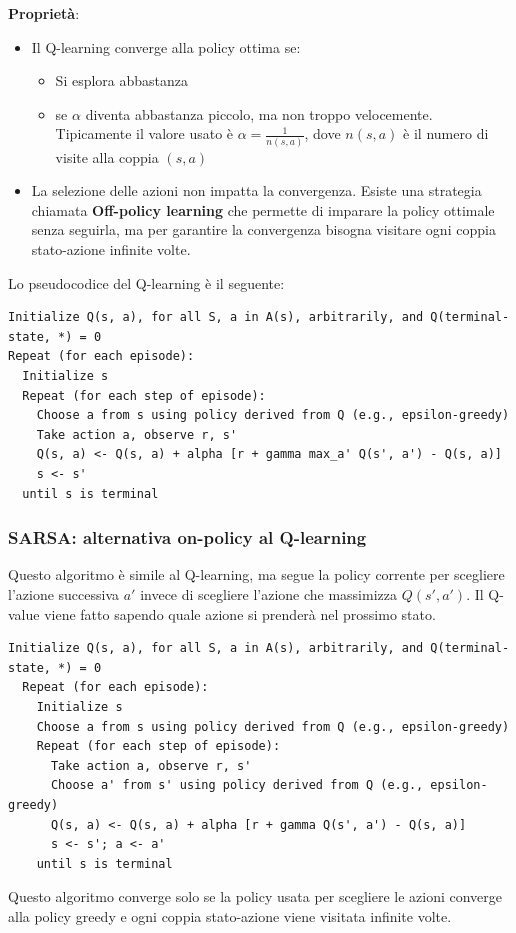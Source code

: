 \documentclass[a4paper]{article}
\begin{document}
\vspace{1em}
\noindent
\textbf{Proprietà}:
\begin{itemize}
  \item Il Q-learning converge alla policy ottima se:
    \begin{itemize}
      \item Si esplora abbastanza
      \item se \( \alpha \) diventa abbastanza piccolo, ma non troppo velocemente.
        Tipicamente il valore usato è \( \alpha = \frac{1}{n(s, a)} \), dove \( n(s,a) \) 
        è il numero di visite alla coppia \( (s,a) \)
    \end{itemize}

  \item La selezione delle azioni non impatta la convergenza. Esiste una strategia chiamata
    \textbf{Off-policy learning} che permette di imparare la policy ottimale senza seguirla,
    ma per garantire la convergenza bisogna visitare ogni coppia stato-azione infinite volte.
\end{itemize}

\vspace{1em}
\noindent
Lo pseudocodice del Q-learning è il seguente:
\begin{lstlisting}
Initialize Q(s, a), for all S, a in A(s), arbitrarily, and Q(terminal-state, *) = 0
Repeat (for each episode):
  Initialize s
  Repeat (for each step of episode):
    Choose a from s using policy derived from Q (e.g., epsilon-greedy)
    Take action a, observe r, s'
    Q(s, a) <- Q(s, a) + alpha [r + gamma max_a' Q(s', a') - Q(s, a)]
    s <- s'
  until s is terminal
\end{lstlisting}

\subsubsection{SARSA: alternativa on-policy al Q-learning}
Questo algoritmo è simile al Q-learning, ma segue la policy corrente per scegliere
l'azione successiva \( a' \) invece di scegliere l'azione che massimizza \( Q(s', a') \).
Il Q-value viene fatto sapendo quale azione si prenderà nel prossimo stato.
\begin{lstlisting}
Initialize Q(s, a), for all S, a in A(s), arbitrarily, and Q(terminal-state, *) = 0
  Repeat (for each episode):
    Initialize s
    Choose a from s using policy derived from Q (e.g., epsilon-greedy)
    Repeat (for each step of episode):
      Take action a, observe r, s'
      Choose a' from s' using policy derived from Q (e.g., epsilon-greedy)
      Q(s, a) <- Q(s, a) + alpha [r + gamma Q(s', a') - Q(s, a)]
      s <- s'; a <- a'
    until s is terminal
\end{lstlisting}
Questo algoritmo converge solo se la policy usata per scegliere le azioni converge
alla policy greedy e ogni coppia stato-azione viene visitata infinite volte.
\end{document}
